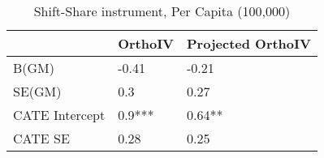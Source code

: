 \begin{table}\centering\caption{Shift-Share instrument, Per Capita (100,000)}\begin{tabular}{lll}
\toprule
                & OrthoIV   & Projected OrthoIV   \\
\midrule
 B(GM)          & -0.41     & -0.21               \\
 SE(GM)         & 0.3       & 0.27                \\
 CATE Intercept & 0.9***    & 0.64**              \\
 CATE SE        & 0.28      & 0.25                \\
\bottomrule
\end{tabular}\end{table}